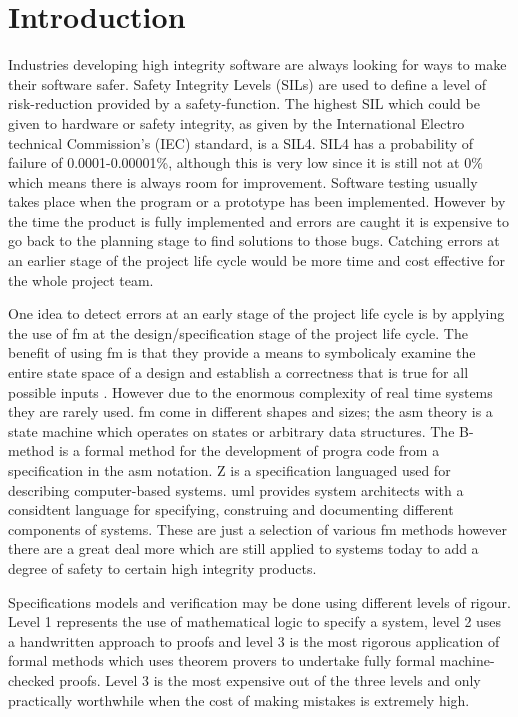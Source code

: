 
\chapter{Introduction}
\label{ch:introduction}

Industries developing high integrity software are always looking for ways to make their software safer. Safety Integrity Levels (SILs) are used to define a level of risk-reduction provided by a safety-function. The highest SIL which could be given to hardware or safety integrity, as given by the International Electro technical Commission's (IEC) standard, is a SIL4. SIL4 has a probability of failure of 0.0001-0.00001\%, although this is very low since it is still not at 0\% which means there is always room for improvement. Software testing usually takes place when the program or a prototype has been implemented. However by the time the product is fully implemented and errors are caught it is expensive to go back to the planning stage to find solutions to those bugs. Catching errors at an earlier stage of the project life cycle would be more time and cost effective for the whole project team.

One idea to detect errors at an early stage of the project life cycle is by applying the use of \gls{fm} at the design/specification stage of the project life cycle. The benefit of using \gls{fm} is that they provide a means to symbolicaly examine the entire state space of a design and establish a correctness that is true for all possible inputs \cite{wifrm}. However due to the enormous complexity of real time systems they are rarely used. \Gls{fm} come in different shapes and sizes; the \gls{asm} theory is a state machine which operates on states or arbitrary data structures. The B-method \cite{bmeth} is a formal method for the development of progra code from a specification in the \gls{asm} notation. Z \cite{spiveyreferencemanual} is a specification languaged used for describing computer-based systems. \Gls{uml} provides system architects with a considtent language for specifying, construing and documenting different components of systems. These are just a selection of various \gls{fm} methods however there are a great deal more which are still applied to systems today to add a degree of safety to certain high integrity products.

Specifications models and verification may be done using different levels of rigour. Level 1 represents the use of mathematical logic to specify a system, level 2 uses a handwritten approach to proofs and level 3 is the most rigorous application of formal methods which uses theorem provers to undertake fully formal machine-checked proofs. Level 3 is the most expensive out of the three levels and only practically worthwhile when the cost of making mistakes is extremely high.


